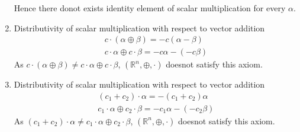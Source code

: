 \documentclass[journal,12pt,twocolumn]{IEEEtran}
\begin{document}
\begin{enumerate}
Hence there donot exists identity element of scalar multiplication for every $\alpha$.
\item Distributivity of scalar multiplication with respect to vector addition
\begin{align}
c\cdot(\alpha\oplus\beta)=-c(\alpha-\beta)\\
c\cdot\alpha\oplus c\cdot\beta=-c\alpha-(-c\beta)
\end{align}
As $ c\cdot(\alpha\oplus\beta)\neq c\cdot\alpha\oplus c\cdot\beta $,  $(\mathbb{R}^n,\oplus,\cdot)$ doesnot satisfy this axiom.
\item Distributivity of scalar multiplication with respect to vector addition
\begin{align}
(c_1+c_2)\cdot\alpha=-(c_1+c_2)\alpha\\
c_1\cdot\alpha\oplus c_2\cdot\beta=-c_1\alpha-(-c_2\beta)
\end{align}
As $(c_1+c_2)\cdot\alpha\neq c_1\cdot\alpha\oplus c_2\cdot\beta$, $(\mathbb{R}^n,\oplus,\cdot)$ doesnot satisfy this axiom.
\end{enumerate}
\end{document}
